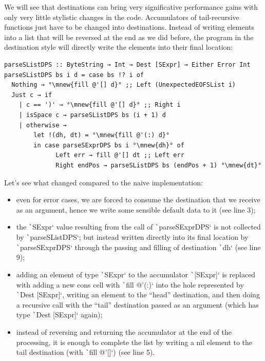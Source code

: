 \documentclass[english]{jflart}
\newcommand{\mnew}[1]{\colorbox{green}{#1}}
\begin{document}
We will see that destinations can bring very significative performance gains with only very little stylistic changes in the code. Accumulators of tail-recursive functions just have to be changed into destinations. Instead of writing elements into a list that will be reversed at the end as we did before, the program in the destination style will directly write the elements into their final location:

{\small
\begin{verbatim}
parseSListDPS :: ByteString → Int → Dest [SExpr] ⊸ Either Error Int
parseSListDPS bs i d = case bs !? i of
  Nothing → °\mnew{fill @'[] d}° ;; Left (UnexpectedEOFSList i)
  Just c → if
    | c == ')' → °\mnew{fill @'[] d}° ;; Right i
    | isSpace c → parseSListDPS bs (i + 1) d
    | otherwise →
        let !(dh, dt) = °\mnew{fill @'(:) d}°
        in case parseSExprDPS bs i °\mnew{dh}° of
              Left err → fill @'[] dt ;; Left err
              Right endPos → parseSListDPS bs (endPos + 1) °\mnew{dt}°
\end{verbatim}
}

Let's see what changed compared to the naive implementation:

\begin{itemize}
  \item even for error cases, we are forced to consume the destination that we receive as an argument, hence we write some sensible default data to it (see line 3);
  \item the \texttt`SExpr` value resulting from the call of \texttt`parseSExprDPS` is not collected by \texttt`parseSListDPS`; but instead written directly into its final location by \texttt`parseSExprDPS` through the passing and filling of destination \texttt`dh` (see line 9);
  \item adding an element of type \texttt`SExpr` to the accumulator \texttt`[SExpr]` is replaced with adding a new cons cell with \texttt`fill @'(:)` into the hole represented by \texttt`Dest [SExpr]`, writing an element to the ``head'' destination, and then doing a recursive call with the ``tail'' destination passed as an argument (which has type \texttt`Dest [SExpr]` again);
  \item instead of reversing and returning the accumulator at the end of the processing, it is enough to complete the list by writing a nil element to the tail destination (with \texttt`fill @'[]`) (see line 5).
\end{itemize}
\end{document}

